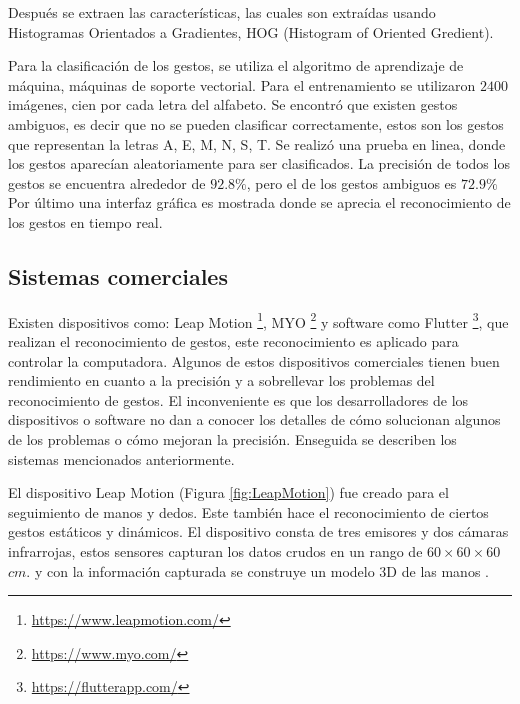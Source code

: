 Después se extraen las características, las cuales son extraídas usando Histogramas Orientados a Gradientes, HOG (Histogram of Oriented Gredient).  

Para la clasificación de los gestos, se utiliza el algoritmo de aprendizaje de máquina, máquinas de soporte vectorial.
Para el entrenamiento se utilizaron $2400$ imágenes, cien por cada letra del alfabeto. Se encontró que existen gestos ambiguos, es decir que no se pueden clasificar correctamente, estos son los gestos que representan la letras A, E, M, N, S, T. 
Se realizó una prueba en linea, donde los gestos aparecían aleatoriamente para ser clasificados. La precisión de todos los gestos se encuentra alrededor de $92.8 \%$, pero el de los gestos ambiguos es $72.9 \%$
Por último una interfaz gráfica es mostrada donde se aprecia el reconocimiento de los gestos en tiempo real.  


 
\subsection{Sistemas comerciales}

Existen dispositivos como: Leap Motion \footnote{\label{LeapMotionFN} \url{https://www.leapmotion.com/}}, MYO \footnote{\label{MyoFN}  \url{https://www.myo.com/}} y software como Flutter \footnote{\label{FlutterFN} \url{ https://flutterapp.com/}}, que realizan el reconocimiento de gestos, este reconocimiento es aplicado para controlar la computadora. Algunos de estos dispositivos comerciales tienen  buen rendimiento en cuanto a la precisión y a sobrellevar los problemas del reconocimiento de gestos. El inconveniente es que los desarrolladores de los dispositivos o software no dan a conocer los detalles de cómo solucionan algunos de los problemas o cómo mejoran la precisión. 
Enseguida se describen los sistemas mencionados anteriormente.
 
El dispositivo Leap Motion (Figura \ref{fig:LeapMotion}) fue creado para el seguimiento de manos y dedos. Este también hace el reconocimiento de ciertos gestos estáticos y dinámicos. El dispositivo consta de tres emisores y dos cámaras infrarrojas, estos sensores capturan los datos crudos en un rango de $60 \times 60 \times 60$ $cm.$ y con la información capturada se construye un modelo 3D de las manos \citep{Weichert2013}. 

